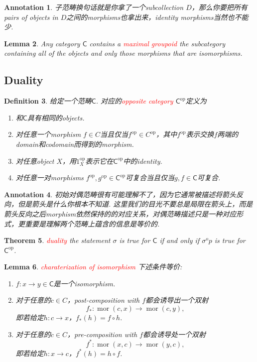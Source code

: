 \documentclass{article}
\newtheorem{theorem}{Theorem}[section]
\newtheorem{lemma}[theorem]{Lemma}
\newtheorem{definition}[theorem]{Definition}
\newtheorem{annotation}[theorem]{Annotation}
\newcommand*{\cat}[1]{\textsf{#1}\xspace}
\newcommand{\id}{1}
\newcommand{\op}{\textrm{op}}
\newcommand*{\xfunc}[4]{{#2}\colon{#3}{#1}{#4}}
\newcommand*{\func}[3]{\xfunc{\to}{#1}{#2}{#3}}
\DeclareMathOperator{\mor}{mor}
\newcommand{\redt}[1]{\textcolor{red}{#1}}
\begin{document}
\begin{annotation}
\rm 子范畴换句话就是你拿了一个subcollection $D$，那么你要把所有pairs of objects in $D$之间的morphisms也拿出来，identity morphisms当然也不能少. 
\end{annotation}

\begin{lemma}
\rm Any category $\cat{C}$ contains a \redt{maximal groupoid} the subcategory containing all of the objects and only those morphisms that are isomorphisms. 
\end{lemma}

\newpage
\subsection{Duality}

\begin{definition}
\rm 给定一个范畴$\cat{C}$. 对应的\redt{opposite category} $\cat{C}^\op$定义为
\begin{enumerate}
	\item 和$\cat{C}$具有相同的objects.
	\item 对任意一个morphism $f \in C$当且仅当$f^\op \in C^\op$，其中$f^\op$表示交换$f$两端的domain和codomain而得到的morphism. 
	\item 对任意object $X$，用$\id_X^\op$表示它在$\cat{C}^\op$中的identity.
	\item 对任意一对morphisms $f^\op, g^\op \in \cat{C}^\op$可复合当且仅当$g,f \in \cat{C}$可复合.    
\end{enumerate}
\end{definition}

\begin{annotation}
\rm 初始对偶范畴很有可能理解不了，因为它通常被描述将箭头反向，但是箭头是什么你根本不知道. 这里我们的目光不要总是局限在箭头上，而是箭头反向之后morphism依然保持的的对应关系，对偶范畴描述只是一种对应形式，更重要是理解两个范畴上蕴含的信息是等价的. 
\end{annotation}

\begin{theorem}
\rm \redt{duality} the statement $\sigma$ is true for $\cat{C}$ if and only if $\sigma^op$ is true for $\cat{C}^\op$. 
\end{theorem}

\begin{lemma}
\rm \redt{charaterization of isomorphism} 下述条件等价:
\begin{enumerate}
	\item $\func{f}{x}{y} \in \cat{C}$是一个isomorphism.
	\item 对于任意的$c \in C$，post-composition with $f$都会诱导出一个双射
	$$
	\func{f_*}{\mor(c,x)}{\mor(c,y)},
	$$
	即若给定$\func{h}{c}{x}$，$f_*(h) = f \circ h$.
	\item 对于任意的$c \in C$，pre-composition with $f$都会诱导处一个双射
	$$
	\func{f^*}{\mor(x,c)}{\mor(y,c)},
	$$
	即若给定$\func{h}{x}{c}$，$f^*(h) = h \circ f$.  
\end{enumerate}
\end{lemma}
\end{document}
